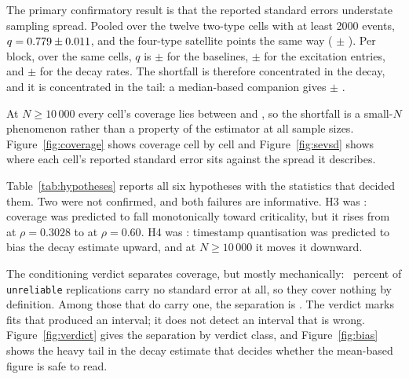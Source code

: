 \begin{table}[t]
\centering
\caption{The six pre-registered hypotheses, after Holm correction. $T$ is the
estimated statistic, $\tau$ the threshold fixed before the data existed, SE the
standard error of $T$ and $z$ the standardised distance from the threshold. H1 and
H2 are exploratory because an earlier study had already seen their direction. Where
admissible readings of a standard error disagreed, the outcome is the least
favourable one any of them produces.}
\label{tab:hypotheses}

\end{table}

The primary confirmatory result is that the reported standard errors understate
sampling spread. Pooled over the twelve two-type cells with at least 2000 events,
$q = 0.779{} \pm 0.011{}$, and the four-type satellite points the same way
(\HsixSatQ{} $\pm$ \HsixSatSe{}). Per block, over the same cells, $q$ is
\HsixQMu{} $\pm$ \HsixQMuSe{} for the baselines, \HsixQAlpha{} $\pm$
\HsixQAlphaSe{} for the excitation entries, and \HsixQBeta{} $\pm$ \HsixQBetaSe{}
for the decay rates. The shortfall is therefore concentrated in the decay, and it
is concentrated in the tail: a median-based companion gives \HsixQRob{} $\pm$
\HsixQRobSe{}.

At $N \ge 10\,000$ every cell's coverage lies between \HsixCovLargeLow{} and
\HsixCovLargeHigh{}, so the shortfall is a small-$N$ phenomenon rather than a
property of the estimator at all sample sizes. Figure~\ref{fig:coverage} shows
coverage cell by cell and Figure~\ref{fig:sevsd} shows where each cell's reported
standard error sits against the spread it describes.

Table~\ref{tab:hypotheses} reports all six hypotheses with the statistics that
decided them. Two were not confirmed, and both failures are informative. H3 was
\HsixThreeLabel{}: coverage was predicted to fall monotonically toward criticality,
but it rises from \HsixThreeLowRho{} at $\rho = 0.3028$ to \HsixThreeHighRho{} at
$\rho = 0.60$. H4 was \HsixFourLabel{}: timestamp quantisation was predicted to bias
the decay estimate upward, and at $N \ge 10\,000$ it moves it downward.

The conditioning verdict separates coverage, but mostly mechanically:
\HsixMechanicalShare{}~percent of \texttt{unreliable} replications carry no
standard error at all, so they
cover nothing by definition. Among those that do carry one, the separation is
\HsixPostHoc{}. The verdict marks fits that produced an interval; it does not
detect an interval that is wrong. Figure~\ref{fig:verdict} gives the separation by
verdict class, and Figure~\ref{fig:bias} shows the heavy tail in the decay
estimate that decides whether the mean-based figure is safe to read.


